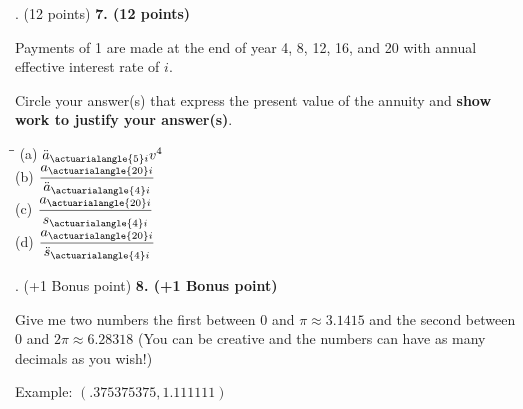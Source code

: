 \documentclass[12pt]{article}
\makeatletter
\newenvironment{problem}[1][]{%
  \bigskip%
  \noindent\begin{boxedminipage}{\columnwidth}%
  \def\@tempa{#1}%
  \ifx\@tempa\empty\else%
    \textbf{#1}\hspace{0.5em}%
  \fi%
}{%
  \end{boxedminipage}%
}
\makeatother
\begin{document}
\newpage
\begin{problem}[7. (12 points)]
Payments of 1 are made at the end of year 4, 8, 12, 16, and 20 with annual effective interest rate of \( i \).

\bigskip

Circle your answer(s) that express the present value of the annuity and \textbf{show work to justify your answer(s)}.

\bigskip

\begin{tabbing}
\hspace{0.6cm}\=\hspace{1cm}\=\kill
(a) \> {$\ddot{a}_{\actuarialangle{5} i} v^4$} \\[1.5ex]
(b) \> {$\dfrac{a_{\actuarialangle{20} i}}{\ddot{a}_{\actuarialangle{4} i}}$} \\[2ex]
(c) \> {$\dfrac{a_{\actuarialangle{20} i}}{s_{\actuarialangle{4} i}}$} \\[2ex]
(d) \> {$\dfrac{a_{\actuarialangle{20} i}}{\ddot{s}_{\actuarialangle{4} i}}$}
\end{tabbing}
\end{problem}

\newpage

\newpage
\begin{problem}[8. (+1 Bonus point)]
Give me two numbers the first between $0$ and $\pi \approx 3.1415$ and the second between $0$ and $2\pi \approx 6.28318$ (You can be creative and the numbers can have as many decimals as you wish!)


\vspace{1cm}

Example: $(.375375375, 1.111111)$
\end{problem}
\end{document}
